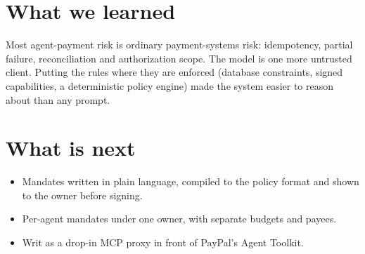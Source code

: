 \documentclass[11pt]{article}
\begin{document}
\section{What we learned}
Most agent-payment risk is ordinary payment-systems risk: idempotency, partial
failure, reconciliation and authorization scope. The model is one more
untrusted client. Putting the rules where they are enforced (database
constraints, signed capabilities, a deterministic policy engine) made the system
easier to reason about than any prompt.

\section{What is next}
\begin{itemize}
  \item Mandates written in plain language, compiled to the policy format and
        shown to the owner before signing.
  \item Per-agent mandates under one owner, with separate budgets and payees.
  \item Writ as a drop-in MCP proxy in front of PayPal's Agent Toolkit.
\end{itemize}
\end{document}
